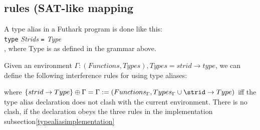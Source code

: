 \subsection{rules (SAT-like mapping }
A type alias in a Futhark program is done like this:\\
\indent \texttt{type} \textit{Strids} \texttt{=} \textit{Type} \\
, where Type is as defined in the grammar above.

Given an environment $\Gamma : (Functions, Types), Types = { strid \to type }$,
we can define the following interference rules for using type aliases:

\begin{prooftree}
\end{prooftree}
where
$ \{strid \to Type\} \oplus \Gamma = \Gamma := (Functions_{\Gamma},
Types_{\Gamma} \cup {\strid \to Type}) $ iff the type alias declaration does not
clash with the current environment. There is no clash, if the declaration obeys
the three rules in the implementation subsection\ref{typealiasimplementation}

\begin{prooftree}
\end{prooftree}

